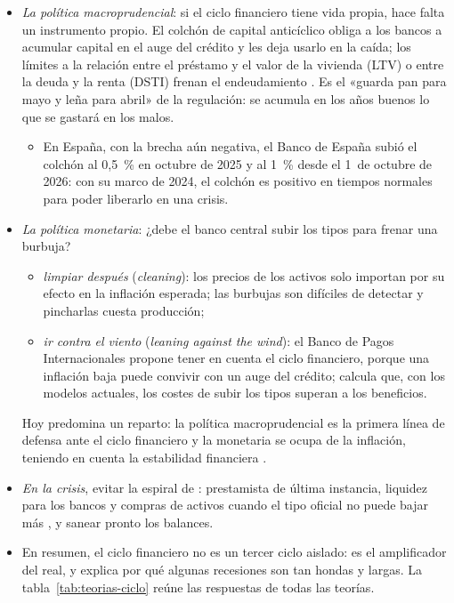 \documentclass[11pt]{article}
\begin{document}
\begin{itemize}
\item \emph{La política macroprudencial}: si el ciclo financiero tiene vida propia, hace falta un instrumento propio. El colchón de capital anticíclico obliga a los bancos a acumular capital en el auge del crédito y les deja usarlo en la caída; los límites a la relación entre el préstamo y el valor de la vivienda (LTV) o entre la deuda y la renta (DSTI) frenan el endeudamiento . Es el «guarda pan para mayo y leña para abril» de la regulación: se acumula en los años buenos lo que se gastará en los malos.
  \begin{itemize}
  \item En España, con la brecha aún negativa, el Banco de España subió el colchón al 0,5~\% en octubre de 2025 y al 1~\% desde el 1~de octubre de 2026: con su marco de 2024, el colchón es positivo en tiempos normales para poder liberarlo en una crisis\nocite{BOE2025CCA,BdE2026CCA}.
  \end{itemize}
\item \emph{La política monetaria}: ¿debe el banco central subir los tipos para frenar una burbuja?
  \begin{itemize}
  \item \emph{limpiar después} (\emph{cleaning}): los precios de los activos solo importan por su efecto en la inflación esperada; las burbujas son difíciles de detectar y pincharlas cuesta producción\nocite{BernankeGertler1999Monetary};
  \item \emph{ir contra el viento} (\emph{leaning against the wind}): el Banco de Pagos Internacionales propone tener en cuenta el ciclo financiero, porque una inflación baja puede convivir con un auge del crédito\nocite{Borio2014Financial}; \textcite{Svensson2017Cost} calcula que, con los modelos actuales, los costes de subir los tipos superan a los beneficios.
  \end{itemize}
  Hoy predomina un reparto: la política macroprudencial es la primera línea de defensa ante el ciclo financiero y la monetaria se ocupa de la inflación, teniendo en cuenta la estabilidad financiera .
\item \emph{En la crisis}, evitar la espiral de : prestamista de última instancia, liquidez para los bancos y compras de activos cuando el tipo oficial no puede bajar más , y sanear pronto los balances.
\item En resumen, el ciclo financiero no es un tercer ciclo aislado: es el amplificador del real, y explica por qué algunas recesiones son tan hondas y largas. La tabla~\ref{tab:teorias-ciclo} reúne las respuestas de todas las teorías.
\end{itemize}
\end{document}
